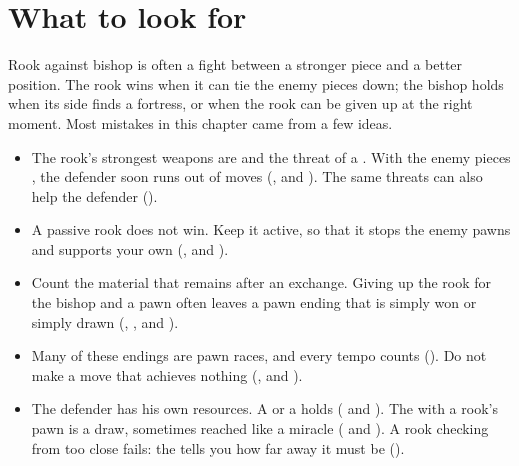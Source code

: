 \section*{What to look for}
Rook against bishop is often a fight between a stronger piece and a better position. The rook
wins when it can tie the enemy pieces down; the bishop holds when its side finds a fortress, or
when the rook can be given up at the right moment. Most mistakes in this chapter came from a few
ideas.

\begin{itemize}
\item The rook's strongest weapons are  and the threat of a
. With the enemy pieces
, the defender soon runs out of moves
(,  and
). The same threats can also help the defender
().

\item A passive rook does not win. Keep it active, so that it stops the enemy pawns and supports
your own (, 
and ).

\item Count the material that remains after an exchange. Giving up the rook for the bishop and a
pawn often leaves a pawn ending that is simply won or simply drawn
(, ,
 and ).

\item Many of these endings are pawn races, and every tempo counts
(). Do not make a move that achieves
nothing (,  and
).

\item The defender has his own resources. A  or a
 holds ( and
). The 
with a rook's pawn is a draw, sometimes reached like a miracle
( and ). A rook checking from too close fails: the
 tells you how far away it must be
().


\end{itemize}
